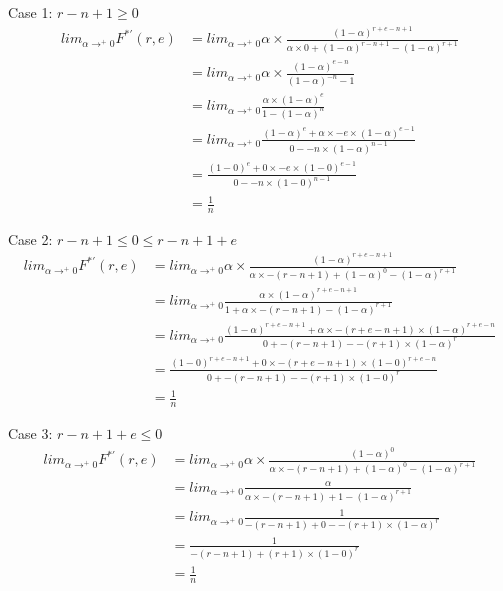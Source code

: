 \documentclass{dalcsthesis}
\begin{document}
Case 1: $r-n+1 \geq 0$ 
\begin{align*}
lim_{\alpha \rightarrow^{+} 0} F^{*'}(r, e)
  &= lim_{\alpha \rightarrow^{+} 0} \alpha \times \frac{(1-\alpha)^{r + e - n + 1}}{\alpha \times 0 + (1-\alpha)^{r-n+1} - (1-\alpha)^{r+1}}
\\&= lim_{\alpha \rightarrow^{+} 0} \alpha \times \frac{(1-\alpha)^{e - n}}{(1-\alpha)^{-n} - 1}
\\&= lim_{\alpha \rightarrow^{+} 0} \frac{\alpha \times (1-\alpha)^e}{1 - (1-\alpha)^n}
\\&= lim_{\alpha \rightarrow^{+} 0} \frac{(1-\alpha)^e + \alpha \times -e \times (1-\alpha)^{e-1}}{0 - -n \times (1-\alpha)^{n-1}}
\\&= \frac{(1-0)^e + 0 \times -e \times (1-0)^{e-1}}{0 - -n \times (1-0)^{n-1}}
\\&= \frac{1}{n}
\end{align*} 

Case 2: $r-n+1 \leq 0 \leq r-n+1+e$ 
\begin{align*}
lim_{\alpha \rightarrow^{+} 0} F^{*'}(r, e)
  &= lim_{\alpha \rightarrow^{+} 0} \alpha \times \frac{(1-\alpha)^{r + e - n + 1}}{\alpha \times -(r-n+1) + (1-\alpha)^0 - (1-\alpha)^{r+1}}
\\&= lim_{\alpha \rightarrow^{+} 0} \frac{\alpha \times (1-\alpha)^{r + e - n + 1}}{1 + \alpha \times -(r-n+1) - (1-\alpha)^{r+1}}
\\&= lim_{\alpha \rightarrow^{+} 0} \frac{(1-\alpha)^{r + e - n + 1} + \alpha \times -(r + e - n + 1) \times (1-\alpha)^{r + e - n}}{0 + -(r-n+1) - -(r+1) \times (1-\alpha)^r}
\\&= \frac{(1-0)^{r + e - n + 1} + 0 \times -(r + e - n + 1) \times (1-0)^{r + e - n}}{0 + -(r-n+1) - -(r+1) \times (1-0)^r}
\\&= \frac{1}{n}
\end{align*} 

Case 3: $r-n+1+e \leq 0$ 
\begin{align*}
lim_{\alpha \rightarrow^{+} 0} F^{*'}(r, e)
  &= lim_{\alpha \rightarrow^{+} 0} \alpha \times \frac{(1-\alpha)^0}{\alpha \times -(r-n+1) + (1-\alpha)^0 - (1-\alpha)^{r+1}}
\\&= lim_{\alpha \rightarrow^{+} 0} \frac{\alpha}{\alpha \times -(r-n+1) + 1 - (1-\alpha)^{r+1}}
\\&= lim_{\alpha \rightarrow^{+} 0} \frac{1}{-(r-n+1) + 0 - -(r+1) \times (1-\alpha)^r}
\\&= \frac{1}{-(r-n+1) + (r+1) \times (1-0)^r}
\\&= \frac{1}{n}
\end{align*} 



\end{document}
